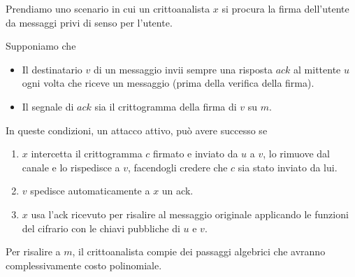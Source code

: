 Prendiamo uno scenario in cui un crittoanalista $x$ si procura la firma dell'utente da messaggi privi di senso
per l'utente.

Supponiamo che
\begin{itemize}
	\item Il destinatario $v$ di un messaggio invii sempre una risposta $ack$ al mittente $u$ ogni volta che
	      riceve un messaggio (prima della verifica della firma).
	\item Il segnale di $ack$ sia il crittogramma della firma di $v$ su $m$.
\end{itemize}
In queste condizioni, un attacco attivo, pu\`o avere successo se
\begin{enumerate}
	\item $x$ intercetta il crittogramma $c$ firmato e inviato da $u$ a $v$, lo rimuove dal canale e lo rispedisce a
	      $v$, facendogli credere che $c$ sia stato inviato da lui.
	\item $v$ spedisce automaticamente a $x$ un ack.
	\item $x$ usa l'ack ricevuto per risalire al messaggio originale applicando le funzioni del cifrario con le
	      chiavi pubbliche di $u$ e $v$.
\end{enumerate}
Per risalire a $m$, il crittoanalista compie dei passaggi algebrici che avranno complessivamente costo polinomiale.

